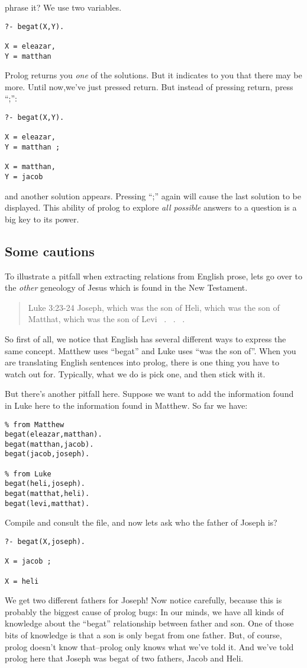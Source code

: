 \documentclass{book}[9pt]
\begin{document}
phrase it?  We use two variables.
\begin{verbatim}
?- begat(X,Y).

X = eleazar,
Y = matthan
\end{verbatim}
\noindent Prolog returns you {\em one} of the solutions.  But it
indicates to you that there may be more.  Until now,we've just pressed return.
But instead of pressing return, press ``;'':
\begin{verbatim}
?- begat(X,Y).

X = eleazar,
Y = matthan ;

X = matthan,
Y = jacob 
\end{verbatim}
\noindent and another solution appears.  Pressing ``;'' again will
cause the last solution to be displayed.  This ability of prolog to
explore {\em all possible} answers to a question is a big key to its
power.

\subsection{Some cautions}

To illustrate a pitfall when extracting relations from English prose, 
lets go over to the {\em other} geneology of Jesus which is found in
the New Testament. 
\begin{quote}
Luke 3:23-24 
Joseph, which was the son of Heli, which was the son of
Matthat, which was the son of Levi \ . \ . \ .
\end{quote}
\noindent So first of all, we notice that English has several
different ways to express the same concept.  Matthew uses ``begat''
and Luke uses ``was the son of''.  When you are translating English
sentences into prolog, there is one thing you have to watch out for.
Typically, what we do is pick one, and then stick with it.

But there's another pitfall here.  Suppose we want to add the
information found in Luke here to the information found in Matthew.
So far we have:
\begin{verbatim}
% from Matthew
begat(eleazar,matthan).
begat(matthan,jacob).
begat(jacob,joseph).

% from Luke
begat(heli,joseph).
begat(matthat,heli).
begat(levi,matthat).
\end{verbatim}
\noindent Compile and consult the file, and now lets ask who the
father of Joseph is?
\begin{verbatim}
?- begat(X,joseph).

X = jacob ;

X = heli
\end{verbatim}
\noindent We get two different fathers for Joseph!  Now notice
carefully, because this is probably the biggest cause of prolog bugs:
In our minds, we have all kinds of knowledge about the ``begat''
relationship between father and son.  One of those bits of knowledge
is that a son is only begat from one father.  But, of course, prolog
doesn't know that--prolog only knows what we've told it.  And we've
told prolog here that Joseph was begat of two fathers, Jacob and Heli.
\end{document}
